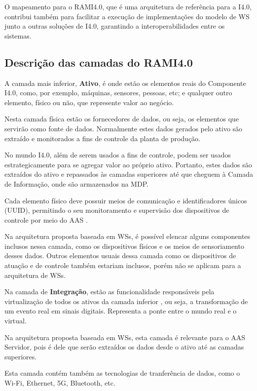 	O mapeamento para o RAMI4.0, que é uma arquitetura de referência para a I4.0, contribui também para facilitar a execução de implementações do modelo de WS junto a outras soluções de I4.0, garantindo a interoperabilidades entre os sistemas.

\subsection{ Descrição das camadas do RAMI4.0 }

	A camada mais inferior, \textbf{Ativo}, é onde estão os elementos reais do Componente I4.0, como, por exemplo, máquinas, sensores, pessoas, etc; e qualquer outro elemento, físico ou não, que represente valor ao negócio.
	
	Nesta camada física estão os fornecedores de dados, ou seja, os elementos que servirão como fonte de dados. Normalmente estes dados gerados pelo ativo são extraído e monitorados a fins de controle da planta de produção. 
	
	No mundo I4.0, além de serem usados a fins de controle, podem ser usados estrategicamente para se agregar valor ao próprio ativo. Portanto, estes dados são extraídos do ativo e repassados às camadas superiores até que cheguem à Camada de Informação, onde são armazenados na MDP.
	
	Cada elemento físico deve possuir meios de comunicação e identificadores únicos (UUID), permitindo o seu monitoramento e supervisão dos dispositivos de controle por meio do AAS \cite{adolphs2015rami}.
	
	Na arquitetura proposta baseada em WSs, é possível elencar alguns componentes inclusos nessa camada, como os dispositivos físicos e os meios de sensoriamento desses dados. Outros elementos usuais dessa camada como os dispositivos de atuação e de controle também estariam inclusos, porém não se aplicam para a arquitetura de WSs.
	
	Na camada de \textbf{Integração}, estão as funcionalidade responsáveis pela virtualização de todos os ativos da camada inferior \cite{adolphs2015rami}, ou seja, a transformação de um evento real em sinais digitais. Representa a ponte entre o mundo real e o virtual.
	
	Na arquitetura proposta baseada em WSs, esta camada é relevante para o AAS Servidor, pois é dele que serão extraídos os dados desde o ativo até as camadas superiores.
	
	Esta camada contém também  as tecnologias de tranferência de dados, como o Wi-Fi, Ethernet, 5G, Bluetooth, etc.
	
